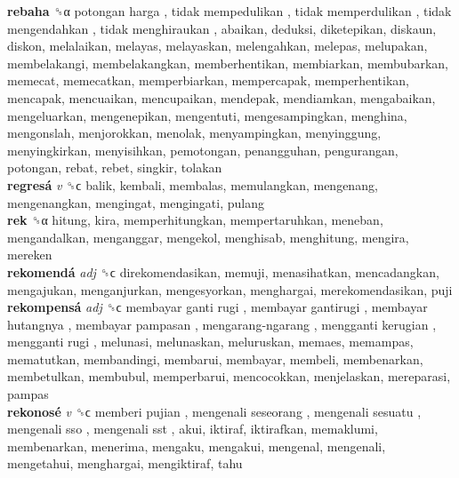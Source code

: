 \textbf{rebaha} ␝α   potongan harga ,  tidak mempedulikan ,  tidak memperdulikan ,  tidak mengendahkan ,  tidak menghiraukan , abaikan, deduksi, diketepikan, diskaun, diskon, melalaikan, melayas, melayaskan, melengahkan, melepas, melupakan, membelakangi, membelakangkan, memberhentikan, membiarkan, membubarkan, memecat, memecatkan, memperbiarkan, mempercapak, memperhentikan, mencapak, mencuaikan, mencupaikan, mendepak, mendiamkan, mengabaikan, mengeluarkan, mengenepikan, mengentuti, mengesampingkan, menghina, mengonslah, menjorokkan, menolak, menyampingkan, menyinggung, menyingkirkan, menyisihkan, pemotongan, penangguhan, pengurangan, potongan, rebat, rebet, singkir, tolakan  \\
\textbf{regresá} \emph{v}  ␝ϲ  balik, kembali, membalas, memulangkan, mengenang, mengenangkan, mengingat, mengingati, pulang  \\
\textbf{rek} ␝α  hitung, kira, memperhitungkan, mempertaruhkan, meneban, mengandalkan, menganggar, mengekol, menghisab, menghitung, mengira, mereken  \\
\textbf{rekomendá} \emph{adj}  ␝ϲ  direkomendasikan, memuji, menasihatkan, mencadangkan, mengajukan, menganjurkan, mengesyorkan, menghargai, merekomendasikan, puji  \\
\textbf{rekompensá} \emph{adj}  ␝ϲ   membayar ganti rugi ,  membayar gantirugi ,  membayar hutangnya ,  membayar pampasan ,  mengarang-ngarang ,  mengganti kerugian ,  mengganti rugi , melunasi, melunaskan, meluruskan, memaes, memampas, mematutkan, membandingi, membarui, membayar, membeli, membenarkan, membetulkan, membubul, memperbarui, mencocokkan, menjelaskan, mereparasi, pampas  \\
\textbf{rekonosé} \emph{v}  ␝ϲ   memberi pujian ,  mengenali seseorang ,  mengenali sesuatu ,  mengenali sso ,  mengenali sst , akui, iktiraf, iktirafkan, memaklumi, membenarkan, menerima, mengaku, mengakui, mengenal, mengenali, mengetahui, menghargai, mengiktiraf, tahu  \\
